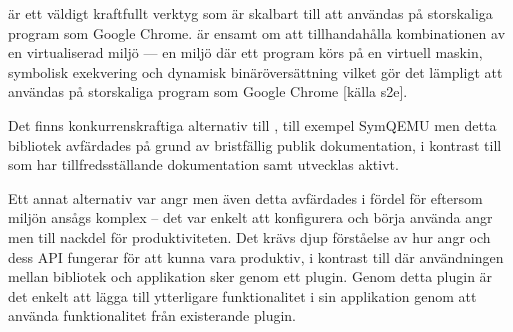 \stoe{} är ett väldigt kraftfullt verktyg som är skalbart till att användas på
storskaliga program som Google Chrome. \stoe{} är ensamt om att tillhandahålla
kombinationen av en virtualiserad miljö — en miljö där ett program körs på en
virtuell maskin, symbolisk exekvering och dynamisk binäröversättning vilket gör
det lämpligt att användas på storskaliga program som Google Chrome [källa s2e].

Det finns konkurrenskraftiga alternativ till \stoe{}, till exempel SymQEMU men
detta bibliotek avfärdades på grund av bristfällig publik dokumentation, i
kontrast till \stoe{} som har tillfredsställande dokumentation samt utvecklas
aktivt. 

Ett annat alternativ var angr men även detta avfärdades i fördel för \stoe{}
eftersom miljön ansågs komplex – det var enkelt att konfigurera och börja
använda angr men till nackdel för produktiviteten. Det krävs djup förståelse av
hur angr och dess API fungerar för att kunna vara produktiv, i kontrast till
\stoe{} där användningen mellan bibliotek och applikation sker genom ett plugin.
Genom detta plugin är det enkelt att lägga till ytterligare funktionalitet i sin
applikation genom att använda funktionalitet från existerande plugin. 


